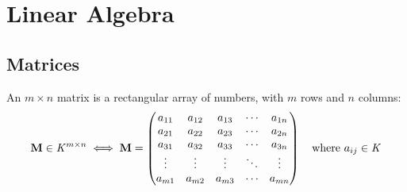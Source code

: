 \section{Linear Algebra}

\subsection{Matrices}

An \(m \times n\) matrix is a rectangular array of numbers, with \(m\) rows and
\(n\) columns:
\begin{equation*}
\mathbf{M} \in \mathit{K}^{m \times n} \iff \mathbf{M} =
\begin{pmatrix}
a_{11} & a_{12} & a_{13} & \cdots & a_{1n} \\
a_{21} & a_{22} & a_{23} & \cdots & a_{2n} \\
a_{31} & a_{32} & a_{33} & \cdots & a_{3n} \\
\vdots & \vdots & \vdots & \ddots & \vdots \\
a_{m1} & a_{m2} & a_{m3} & \cdots & a_{mn}
\end{pmatrix}
\quad \text{where \(a_{ij} \in \mathit{K}\)}
\end{equation*}


